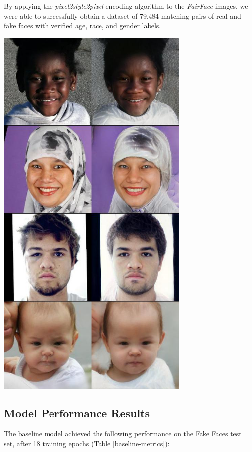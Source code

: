 \documentclass[11pt, letterpaper]{article}
\newenvironment{Figure}
  {\par\medskip\noindent\minipage{\linewidth}}
  {\endminipage\par\medskip}
\begin{document}
\begin{multicols}{2}
  By applying the \emph{pixel2style2pixel} encoding algorithm to the
  \emph{FairFace} images, we were able to successfully obtain a
  dataset of 79,484 matching pairs of real and fake faces with
  verified age, race, and gender labels.

  \begin{Figure}
    \centering
    \includegraphics[width=0.7\textwidth]{figures/fair2fake.jpg}
    \label{fair2fake}
  \end{Figure}

  \subsection{Model Performance Results}

  The baseline model achieved the following performance on the Fake Faces test
  set, after 18 training epochs (Table \ref{baseline-metrics}):


\end{multicols}
\end{document}
